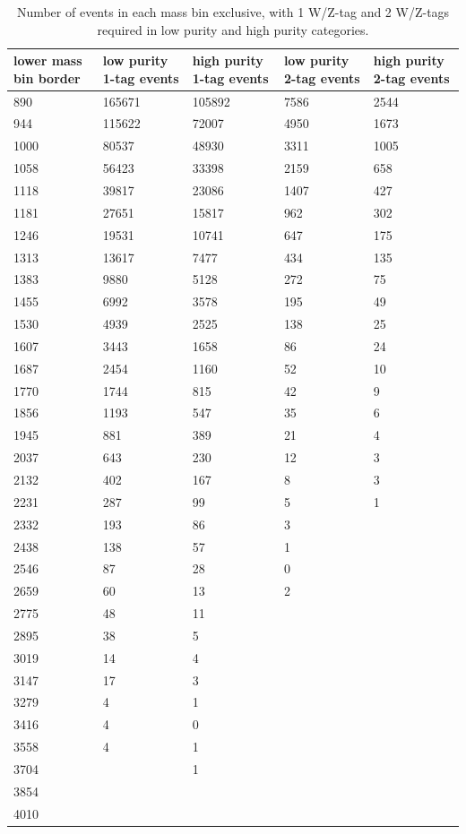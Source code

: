 \begin{table}[htb]
\begin{tabular}{|p{3.0cm}|p{3.0cm}|p{3.0cm}|p{3.0cm}|p{3.0cm}|}
\hline
lower mass bin border & low purity 1-tag events & high purity 1-tag events& low purity 2-tag events& high purity 2-tag events\\
\hline
890 & 165671 & 105892 & 7586 & 2544 \\ 
944 & 115622 & 72007 & 4950 & 1673 \\ 
1000 & 80537 & 48930 & 3311 & 1005 \\ 
1058 & 56423 & 33398 & 2159 & 658 \\ 
1118 & 39817 & 23086 & 1407 & 427 \\ 
1181 & 27651 & 15817 & 962 & 302 \\ 
1246 & 19531 & 10741 & 647 & 175 \\ 
1313 & 13617 & 7477 & 434 & 135 \\ 
1383 & 9880 & 5128 & 272 & 75 \\ 
1455 & 6992 & 3578 & 195 & 49 \\ 
1530 & 4939 & 2525 & 138 & 25 \\ 
1607 & 3443 & 1658 & 86 & 24 \\ 
1687 & 2454 & 1160 & 52 & 10 \\ 
1770 & 1744 & 815 & 42 & 9 \\ 
1856 & 1193 & 547 & 35 & 6 \\ 
1945 & 881 & 389 & 21 & 4 \\ 
2037 & 643 & 230 & 12 & 3 \\ 
2132 & 402 & 167 & 8 & 3 \\ 
2231 & 287 & 99 & 5 & 1 \\ 
2332 & 193 & 86 & 3 &  \\ 
2438 & 138 & 57 & 1 &  \\ 
2546 & 87 & 28 & 0 &  \\ 
2659 & 60 & 13 & 2 &  \\ 
2775 & 48 & 11 &  &  \\ 
2895 & 38 & 5 &  &  \\ 
3019 & 14 & 4 &  &  \\ 
3147 & 17 & 3 &  &  \\ 
3279 & 4 & 1 &  &  \\ 
3416 & 4 & 0 &  &  \\ 
3558 & 4 & 1 &  &  \\ 
3704 &  & 1 &  &  \\ 
3854 &  &  &  &  \\ 
4010 &  &  &  &  \\ 
\hline
\end{tabular}
\caption{Number of events in each mass bin exclusive, with 1 W/Z-tag and  2 W/Z-tags required in low
purity and high purity categories.}
\label{table:eventnumbers}
\end{table}



